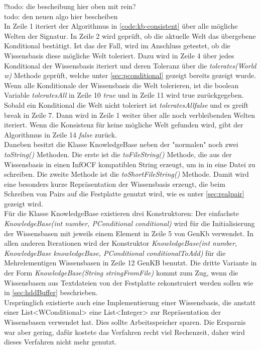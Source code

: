 \documentclass[12pt,a4paper]{article}
\begin{document}
!!todo: die bescheibung hier oben mit rein? \\
todo: den neuen algo hier bescheiben \\
In Zeile 1 iteriert der Algorithmus in \autoref{code:kb-consistent} über alle mögliche Welten der Signatur. In Zeile 2 wird geprüft, ob die aktuelle Welt das übergebene Konditional bestätigt. Ist das der Fall, wird im Anschluss getestet, ob die Wissensbasis diese mögliche Welt toleriert. Dazu wird in Zeile 4 über jedes Konditional der Wissensbasis iteriert und deren Toleranz über die \textit{tolerates(World w)} Methode geprüft, welche unter \autoref{sec:pconditional} gezeigt bereits gezeigt wurde. \\
Wenn alle Konditionale der Wissensbasis die Welt tolerieren, ist die boolean Variable \textit{toleratesAll} in Zeile 10 \textit{true} und in Zeile 11 wird true zurückgegeben. Sobald ein Konditional die Welt nicht toleriert ist \textit{toleratesAll}\textit{false} und es greift break in Zeile 7. Dann wird in Zeile 1 weiter über alle noch verbleibenden Welten iteriert. Wenn die Konsistenz für keine mögliche Welt gefunden wird, gibt der Algorithmus in Zeile 14 \textit {false} zurück. \\
Daneben besitzt die Klasse KnowledgeBase neben der "normalen" noch zwei \textit{toString()} Methoden. Die erste ist die \textit{toFileString()} Methode, die aus der Wissensbasis in einen InfOCF kompatiblen String erzeugt, um in in eine Datei zu schreiben. Die zweite Methode ist die \textit{toShortFileString()} Methode. Damit wird eine besonders kurze Repräsentation der Wissensbasis erzeugt, die beim Schreiben von Pairs auf die Festplatte genutzt wird, wie es unter \autoref{sec:realpair} gezeigt wird. \\
Für die Klasse KnowledgeBase existieren drei Konstruktoren: Der einfachste \textit{KnowledgeBase(int number, PConditional conditional)} wird für die Initialisierung der Wissensbasen mit jeweils einem Element in Zeile 5 von GenKb verwendet. In allen anderen Iterationen wird der Konstruktor \textit{KnowledgeBase(int number, KnowledgeBase knowledgeBase, PConditional conditionalToAdd)} für die Mehrelementigen Wissensbasen in Zeile 12 GenKB benutzt. Die dritte Variante in der Form \textit{KnowledgeBase(String stringFromFile)} kommt zum Zug, wenn die Wissensbasen aus Textdateien von der Festplatte rekonstruiert werden sollen wie in \autoref{sec:hddBuffer} beschrieben. \\
Ursprünglich existierte auch eine Implementierung einer Wissensbasis, die anstatt einer List<WConditional> eine List<Integer> zur Repräsentation der Wissensbasen verwendet hat. Dies sollte Arbeitsspeicher sparen. Die Ersparnis war aber gering, dafür kostete das Verfahren recht viel Rechenzeit, daher wird dieses Verfahren nicht mehr genutzt.
\end{document}
